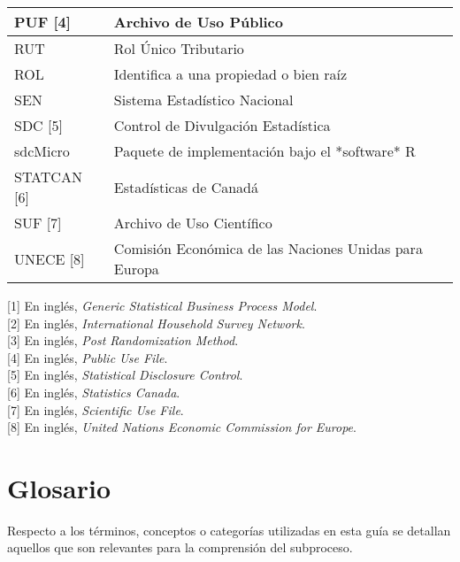 \documentclass[
]{book}
\theoremstyle{definition}
\theoremstyle{definition}
\theoremstyle{definition}
\theoremstyle{definition}
\theoremstyle{remark}
\begin{document}
\begin{table}
\begin{tabular}[t]{l|l}
\hline
PUF [4] & Archivo de Uso Público\\
\hline
RUT & Rol Único Tributario\\
\hline
ROL & Identifica a una propiedad o bien raíz\\
\hline
SEN & Sistema Estadístico Nacional\\
\hline
SDC [5] & Control de Divulgación Estadística\\
\hline
sdcMicro & Paquete de implementación bajo el *software* R\\
\hline
STATCAN [6] & Estadísticas de Canadá\\
\hline
SUF [7] & Archivo de Uso Científico\\
\hline
UNECE [8] & Comisión Económica de las Naciones Unidas para Europa\\
\hline
\end{tabular}
\end{table}

{[}1{]} En inglés, \emph{Generic Statistical Business Process Model}.\\
{[}2{]} En inglés, \emph{International Household Survey Network}.\\
{[}3{]} En inglés, \emph{Post Randomization Method}.\\
{[}4{]} En inglés, \emph{Public Use File}.\\
{[}5{]} En inglés, \emph{Statistical Disclosure Control}.\\
{[}6{]} En inglés, \emph{Statistics Canada}.\\
{[}7{]} En inglés, \emph{Scientific Use File}.\\
{[}8{]} En inglés, \emph{United Nations Economic Commission for Europe}.

\hypertarget{glosario}{%
\section{Glosario}\label{glosario}}

Respecto a los términos, conceptos o categorías utilizadas en esta guía se detallan aquellos que son relevantes para la comprensión del subproceso.
\end{document}
